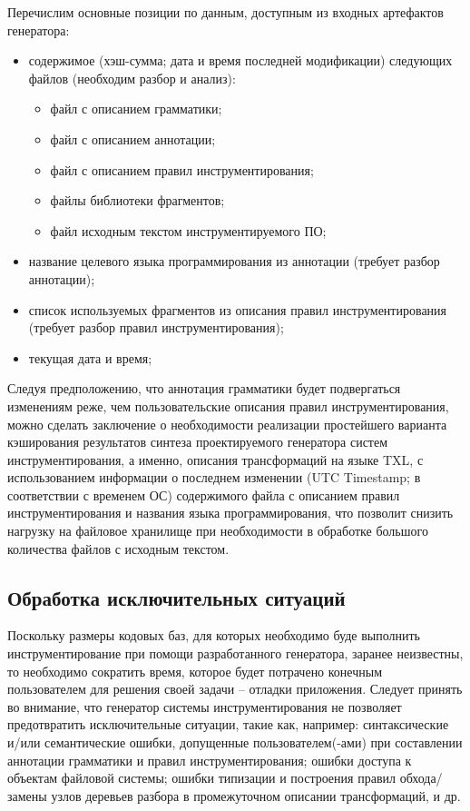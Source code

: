 Перечислим основные позиции по данным, доступным из входных артефактов генератора:
\begin{itemize}[noitemsep]
  \item содержимое (хэш-сумма; дата и время последней модификации) следующих файлов (необходим разбор и анализ):
    \begin{itemize}[noitemsep]
      \item файл с описанием грамматики;
      \item файл с описанием аннотации;
      \item файл с описанием правил инструментирования;
      \item файлы библиотеки фрагментов;
      \item файл исходным текстом инструментируемого ПО;
    \end{itemize}
  \item название целевого языка программирования из аннотации (требует разбор аннотации);
  \item список используемых фрагментов из описания правил инструментирования (требует разбор правил инструментирования);
  \item текущая дата и время;
\end{itemize}

Следуя предположению, что аннотация грамматики будет подвергаться изменениям реже, чем пользовательские описания правил инструментирования, можно сделать заключение о необходимости реализации простейшего варианта кэширования результатов синтеза проектируемого генератора систем инструментирования, а именно, описания трансформаций на языке TXL, с использованием информации о последнем изменении (UTC Timestamp; в соответствии с временем ОС) содержимого файла с описанием правил инструментирования и названия языка программирования, что позволит снизить нагрузку на файловое хранилище при необходимости в обработке большого количества файлов с исходным текстом.

\subsection{Обработка исключительных ситуаций}

Поскольку размеры кодовых баз, для которых необходимо буде выполнить инструментирование при помощи разработанного генератора, заранее неизвестны, то необходимо сократить время, которое будет потрачено конечным пользователем для решения своей задачи -- отладки приложения.
Следует принять во внимание, что генератор системы инструментирования не позволяет предотвратить исключительные ситуации, такие как, например: синтаксические и/или семантические ошибки, допущенные пользователем(-ами) при составлении аннотации грамматики и правил инструментирования; ошибки доступа к объектам файловой системы; ошибки типизации и построения правил обхода/замены узлов деревьев разбора в промежуточном описании трансформаций, и др.

